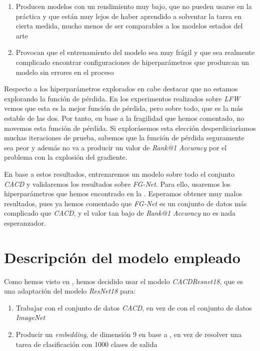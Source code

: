 \begin{enumerate}
    \item Producen modelos con un rendimiento muy bajo, que no pueden usarse en la práctica y que están muy lejos de haber aprendido a solventar la tarea en cierta medida, mucho menos de ser comparables a los modelos estados del arte
    \item Provocan que el entrenamiento del modelo sea muy frágil y que sea realmente complicado encontrar configuraciones de hiperparámetros que produzcan un modelo sin errores en el proceso
\end{enumerate}

Respecto a los hiperparámetros explorados en  cabe destacar que no estamos explorando la función de pérdida. En los experimentos realizados sobre \textit{LFW} vemos que esta es la mejor función de pérdida, pero sobre todo, que es la más estable de las dos. Por tanto, en base a la fragilidad que hemos comentado, no movemos esta función de pérdida. Si explorásemos esta elección desperdiciaríamos muchas iteraciones de prueba, sabemos que la función de pérdida seguramente sea peor y además no va a producir un valor de \textit{Rank@1 Accuracy} por el problema con la explosión del gradiente.

En base a estos resultados, entrenaremos un modelo sobre todo el conjunto \textit{CACD} y validaremos los resultados sobre \textit{FG-Net}. Para ello, usaremos los hiperparámetros que hemos encontrado en la . Esperamos obtener muy malos resultados, pues ya hemos comentado que \textit{FG-Net} es un conjunto de datos más complicado que \textit{CACD}, y el valor tan bajo de \textit{Rank@1 Accuracy} no es nada esperanzador.

\section{Descripción del modelo empleado} \label{isec:explicacion_modelo}

Como hemos visto en , hemos decidido usar el modelo \textit{CACDResnet18}, que es una adaptación del modelo \textit{ResNet18} para:

\begin{enumerate}
    \item Trabajar con el conjunto de datos \textit{CACD}, en vez de con el conjunto de datos \textit{ImageNet}
    \item Producir un \textit{embedding}, de dimensión 9 en base a , en vez de resolver una tarea de clasificación con 1000 clases de salida
\end{enumerate}

